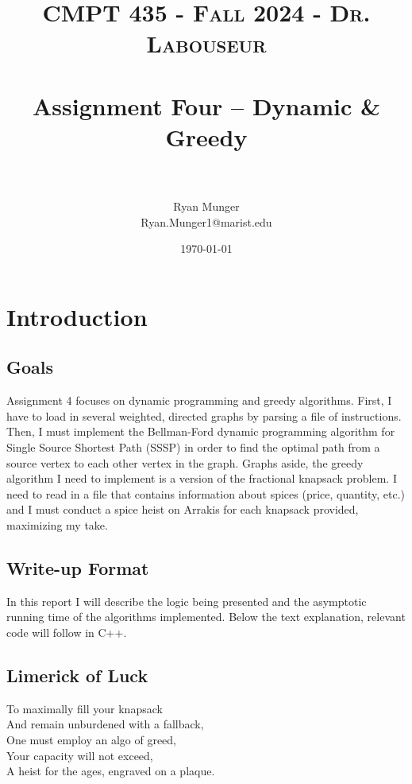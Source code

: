 \documentclass[letterpaper, 10pt]{article}
\title{	
   \normalfont \normalsize 
   \textsc{CMPT 435 - Fall 2024 - Dr. Labouseur} \\[10pt] %
   \horrule{0.5pt} \\[0.25cm] 	%
   \huge Assignment Four -- Dynamic \& Greedy\\     	    %
   \horrule{0.5pt} \\[0.25cm] 	%
}
\author{Ryan Munger \\ \normalsize Ryan.Munger1@marist.edu}
\date{\normalsize\today} 	%
\begin{document}
\maketitle %


\section{Introduction}
\subsection{Goals}
Assignment 4 focuses on dynamic programming and greedy algorithms. First, I have to load in several weighted, directed graphs by parsing a file of instructions. Then, I must implement the Bellman-Ford dynamic programming algorithm for Single Source Shortest Path (SSSP) in order to find the optimal path from a source vertex to each other vertex in the graph. Graphs aside, the greedy algorithm I need to implement is a version of the fractional knapsack problem. I need to read in a file that contains information about spices (price, quantity, etc.) and I must conduct a spice heist on Arrakis for each knapsack provided, maximizing my take.
\subsection{Write-up Format}
    In this report I will describe the logic being presented and the asymptotic running time of the algorithms implemented. Below the text explanation, relevant code will follow in C++. 
\subsection{Limerick of Luck}
\noindent
To maximally fill your knapsack \\
And remain unburdened with a fallback, \\
    \hspace*{1.5em}One must employ an algo of greed, \\
    \hspace*{1.5em}Your capacity will not exceed, \\
A heist for the ages, engraved on a plaque. \\
\newpage
\end{document}
